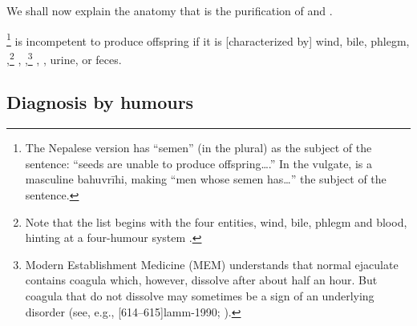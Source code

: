 \begin{translation}
    
    \item [1] We shall now explain the anatomy that is the purification of 
     and 
    .
%    
    
    \item [3]  \footnote{The Nepalese version has
     “semen” (in the plural) as the subject of the
    sentence: “seeds are unable to produce offspring\ldots.”  In the
    vulgate,  is a masculine bahuvrīhi, making “men
    whose semen has\ldots” the subject of the sentence.} is
    incompetent to produce offspring if it is [characterized by] wind,
    bile, phlegm, ,\footnote{Note that the list
        begins with the four entities, wind, bile, phlegm and blood,
        hinting at a four-humour system \citep[see][485--486]{wuja-2000}.}
        ,
        ,\footnote{\label{granthi}Modern
            Establishment Medicine (MEM) understands that normal ejaculate
            contains coagula which, however, dissolve after about half an
            hour.  But coagula that do not dissolve may sometimes be a sign of
            an underlying disorder (see, e.g., 
            [614--615]{lamm-1990}; \cite{cohe-1990}).}
            , ,
            urine, or feces.
    
 \subsection{Diagnosis by humours}

 \item[4]
 

\end{translation}
